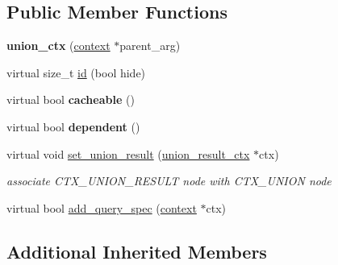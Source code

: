 \subsection*{Public Member Functions}
\begin{DoxyCompactItemize}
\item 
\mbox{\label{classopt__explain__json__namespace_1_1union__ctx_af379275c1bbdc556aed554c484d0eba8}} 
{\bfseries union\+\_\+ctx} (\mbox{\hyperlink{classopt__explain__json__namespace_1_1context}{context}} $\ast$parent\+\_\+arg)
\item 
virtual size\+\_\+t \mbox{\hyperlink{classopt__explain__json__namespace_1_1union__ctx_a12834a26065cdae8c5b5c39d91ecdcec}{id}} (bool hide)
\item 
\mbox{\label{classopt__explain__json__namespace_1_1union__ctx_a23f611e917f89b5c76934d99d80876ae}} 
virtual bool {\bfseries cacheable} ()
\item 
\mbox{\label{classopt__explain__json__namespace_1_1union__ctx_abb7a76ce16724ef374476fa927b8b167}} 
virtual bool {\bfseries dependent} ()
\item 
\mbox{\label{classopt__explain__json__namespace_1_1union__ctx_abd4df216193aa258cbd8c1eb6d983147}} 
virtual void \mbox{\hyperlink{classopt__explain__json__namespace_1_1union__ctx_abd4df216193aa258cbd8c1eb6d983147}{set\+\_\+union\+\_\+result}} (\mbox{\hyperlink{classopt__explain__json__namespace_1_1union__result__ctx}{union\+\_\+result\+\_\+ctx}} $\ast$ctx)
\begin{DoxyCompactList}\small\item\em associate C\+T\+X\+\_\+\+U\+N\+I\+O\+N\+\_\+\+R\+E\+S\+U\+LT node with C\+T\+X\+\_\+\+U\+N\+I\+ON node \end{DoxyCompactList}\item 
virtual bool \mbox{\hyperlink{classopt__explain__json__namespace_1_1union__ctx_a8b491562c9f7455653605a74295b456d}{add\+\_\+query\+\_\+spec}} (\mbox{\hyperlink{classopt__explain__json__namespace_1_1context}{context}} $\ast$ctx)
\end{DoxyCompactItemize}
\subsection*{Additional Inherited Members}


